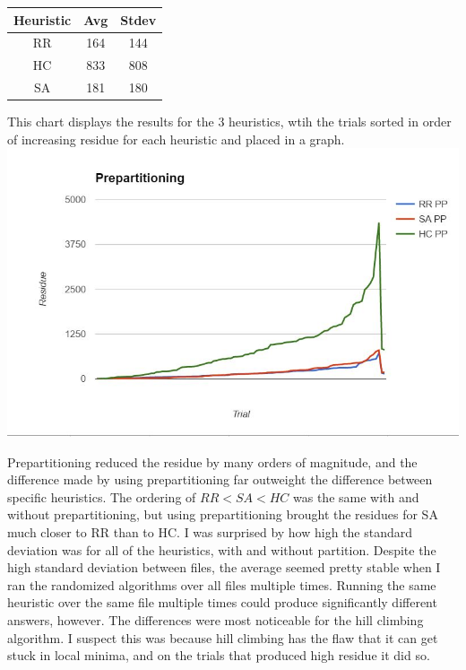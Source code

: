 \documentclass{article}
\begin{document}
\begin{center}
\begin{tabular}{| c | c | c |}
\hline
Heuristic & Avg & Stdev \\
\hline\hline
RR & 164 &  144\\
\hline
HC & 833 & 808\\
\hline
SA & 181 &  180\\
\hline

\end{tabular}
\end{center}
This chart displays the results for the 3 heuristics, wtih the trials sorted in order of increasing residue for each heuristic and placed in a graph. \\
\includegraphics[scale=0.5]{prepartitioning.jpg}

Prepartitioning reduced the residue by many orders of magnitude, and the difference made by using prepartitioning far outweight the difference between specific heuristics. The ordering of $RR < SA < HC$ was the same with and without prepartitioning, but using prepartitioning brought the residues for SA much closer to RR than to HC. I was surprised by how high the standard deviation was for all of the heuristics, with and without partition. Despite the high standard deviation between files, the average seemed pretty stable when I ran the randomized algorithms over all files multiple times. Running the same heuristic over the same file multiple times could produce significantly different answers, however. The differences were most noticeable for the hill climbing algorithm. I suspect this was because hill climbing has the flaw that it can get stuck in local minima, and on the trials that produced high residue it did so. 
\end{document}

